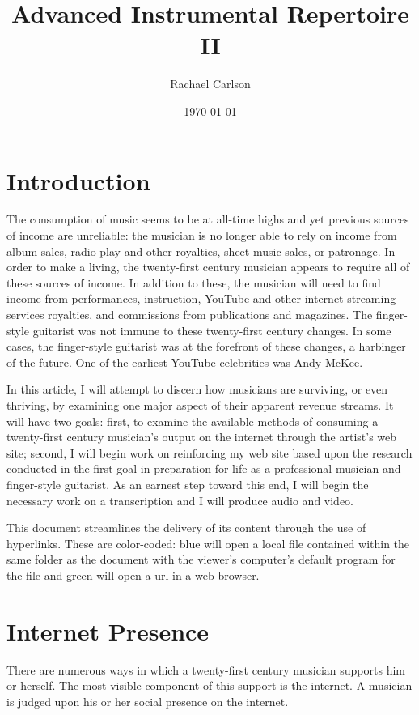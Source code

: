 \documentclass[unicode,hyperfootnotes=false,xetex,colorlinks=true,nofonts,nobib]{tufte-handout}
\title{Advanced Instrumental Repertoire II}
\author{Rachael Carlson}
\date{\today}
\begin{document}
\maketitle{}
\section{Introduction}
The consumption of music seems to be at all-time highs and yet
previous sources of income are unreliable: the musician is no longer
able to rely on income from album sales, radio play and other
royalties, sheet music sales, or patronage. In order to make a living,
the twenty-first century musician appears to require all of these
sources of income. In addition to these, the musician will need to
find income from performances, instruction, YouTube and other internet
streaming services royalties, and commissions from publications and
magazines. The finger-style guitarist was not immune to these
twenty-first century changes. In some cases, the finger-style
guitarist was at the forefront of these changes, a harbinger of the
future. One of the earliest YouTube celebrities was Andy McKee.

In this article, I will attempt to discern how musicians are
surviving, or even thriving, by examining one major aspect of their
apparent revenue streams. It will have two goals: first, to examine
the available methods of consuming a twenty-first century musician's
output on the internet through the artist's web site; second, I will
begin work on reinforcing my web site based upon the research conducted
in the first goal in preparation for life as a professional musician
and finger-style guitarist. As an earnest step toward this end, I
will begin the necessary work on a transcription and I will produce
audio and video.

This document streamlines the delivery of its content through the use
of hyperlinks. These are color-coded: blue will open a local file
contained within the same folder as the document with the viewer's
computer's default program for the file and green will open a url in a
web browser.

\section{Internet Presence}
\label{sec:internet-presence}
There are numerous ways in which a twenty-first century musician
supports him or herself. The most visible component of this support is
the internet. A musician is judged upon his or her social presence on
the internet.
\end{document}
